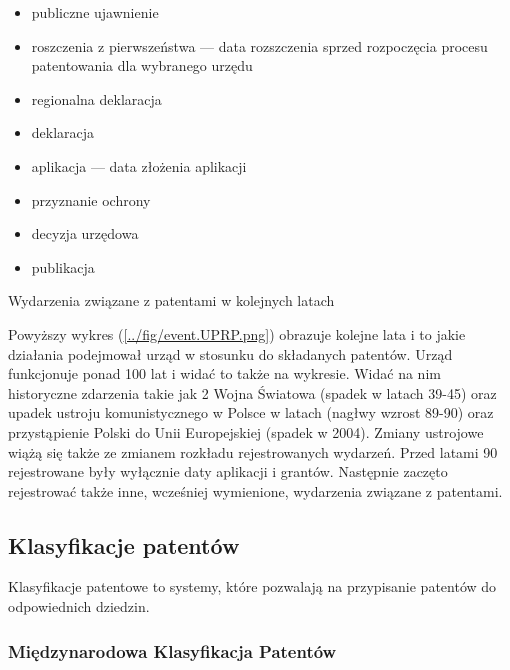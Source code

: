 \begin{multicols}{2}

\begin{itemize}
\item publiczne ujawnienie 
\item roszczenia z pierwszeństwa  --- 
      data rozszczenia sprzed rozpoczęcia procesu patentowania dla wybranego urzędu
\item regionalna deklaracja 
\item deklaracja 
\item aplikacja  --- data złożenia aplikacji
\item przyznanie ochrony 
\item decyzja urzędowa
\item publikacja
\end{itemize}

\columnbreak
{}
{Wydarzenia związane z patentami w kolejnych latach}

\end{multicols}

Powyższy wykres (\ref{../fig/event.UPRP.png}) obrazuje kolejne lata i to jakie
działania podejmował urząd w stosunku do składanych patentów. Urząd funkcjonuje
ponad 100 lat i widać to także na wykresie.
Widać na nim historyczne zdarzenia takie jak 2 Wojna Światowa (spadek w latach 39-45) 
oraz upadek ustroju komunistycznego w Polsce w latach (nagłwy wzrost 89-90) oraz
przystąpienie Polski do Unii Europejskiej (spadek w 2004).
Zmiany ustrojowe wiążą się także ze zmianem rozkładu rejestrowanych wydarzeń.
Przed latami 90 rejestrowane były wyłącznie daty aplikacji i grantów.
Następnie zaczęto rejestrować także inne, wcześniej wymienione, 
wydarzenia związane z patentami.



\newpage
\subsection{Klasyfikacje patentów}

Klasyfikacje patentowe to systemy, które pozwalają na przypisanie
patentów do odpowiednich dziedzin.

\subsubsection{Międzynarodowa Klasyfikacja Patentów}

